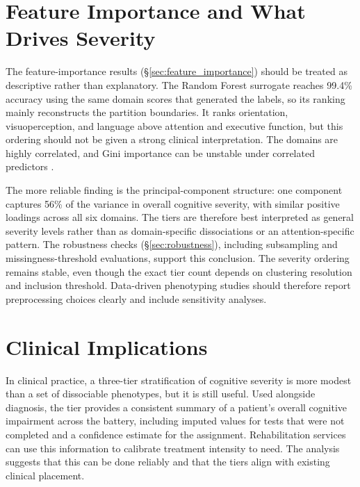 
\section{Feature Importance and What Drives Severity}

The feature-importance results (§\ref{sec:feature_importance}) should be treated as descriptive rather than explanatory. The Random Forest surrogate reaches 99.4\% accuracy using the same domain scores that generated the labels, so its ranking mainly reconstructs the partition boundaries. It ranks orientation, visuoperception, and language above attention and executive function, but this ordering should not be given a strong clinical interpretation. The domains are highly correlated, and Gini importance can be unstable under correlated predictors \parencite{boulesteix2012overview}.

The more reliable finding is the principal-component structure: one component captures 56\% of the variance in overall cognitive severity, with similar positive loadings across all six domains. The tiers are therefore best interpreted as general severity levels rather than as domain-specific dissociations or an attention-specific pattern. The robustness checks (§\ref{sec:robustness}), including subsampling and missingness-threshold evaluations, support this conclusion. The severity ordering remains stable, even though the exact tier count depends on clustering resolution and inclusion threshold. Data-driven phenotyping studies should therefore report preprocessing choices clearly and include sensitivity analyses.


\section{Clinical Implications}

In clinical practice, a three-tier stratification of cognitive severity is more modest than a set of dissociable phenotypes, but it is still useful. Used alongside diagnosis, the tier provides a consistent summary of a patient's overall cognitive impairment across the battery, including imputed values for tests that were not completed and a confidence estimate for the assignment. Rehabilitation services can use this information to calibrate treatment intensity to need. The analysis suggests that this can be done reliably and that the tiers align with existing clinical placement.


